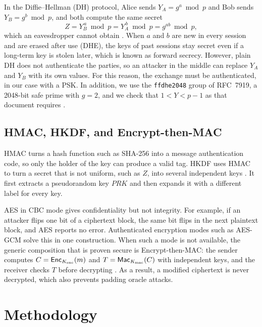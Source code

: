 \documentclass[11pt,a4paper]{article}
\begin{document}
In the Diffie--Hellman (DH) protocol, Alice sends $Y_A = g^{a} \bmod p$ and Bob
sends $Y_B = g^{b} \bmod p$, and both compute the same secret
\begin{equation}
    Z = Y_B^{\,a} \bmod p = Y_A^{\,b} \bmod p = g^{ab} \bmod p ,
    \label{eq:dh}
\end{equation}
which an eavesdropper cannot obtain \cite{katz2020introduction}. When $a$ and
$b$ are new in every session and are erased after use (DHE), the keys of past
sessions stay secret even if a long-term key is stolen later, which is known as
forward secrecy. However, plain DH does not authenticate the parties, so an
attacker in the middle can replace $Y_A$ and $Y_B$ with its own values. For
this reason, the exchange must be authenticated, in our case with a PSK. In
addition, we use the \texttt{ffdhe2048} group of RFC~7919, a 2048-bit safe
prime with $g = 2$, and we check that $1 < Y < p-1$ as that document requires
\cite{rfc7919}.

\subsection{HMAC, HKDF, and Encrypt-then-MAC}

HMAC turns a hash function such as SHA-256 into a message authentication code,
so only the holder of the key can produce a valid tag. HKDF uses HMAC to turn a
secret that is not uniform, such as $Z$, into several independent keys
\cite{rfc5869}. It first extracts a pseudorandom key $\mathit{PRK}$ and then
expands it with a different label for every key.

AES in CBC mode gives confidentiality but not integrity. For example, if an
attacker flips one bit of a ciphertext block, the same bit flips in the next
plaintext block, and AES reports no error. Authenticated encryption modes such
as AES-GCM solve this in one construction. When such a mode is not available,
the generic composition that is proven secure is Encrypt-then-MAC: the sender
computes $C = \mathsf{Enc}_{K_{\mathrm{enc}}}(m)$ and $T = \mathsf{Mac}_{K_{\mathrm{mac}}}(C)$
with independent keys, and the receiver checks $T$ before decrypting
\cite{katz2020introduction}. As a result, a modified ciphertext is never
decrypted, which also prevents padding oracle attacks.


\section{Methodology}
\end{document}
